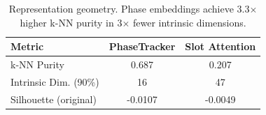 \begin{table}[t]
\centering
\caption{Representation geometry. Phase embeddings achieve 3.3$\times$ higher k-NN purity in 3$\times$ fewer intrinsic dimensions.}
\label{tab:geometry}
\begin{tabular}{lcc}
\toprule
Metric & PhaseTracker & Slot Attention \\
\midrule
k-NN Purity & 0.687 & 0.207 \\
Intrinsic Dim. (90\%) & 16 & 47 \\
Silhouette (original) & -0.0107 & -0.0049 \\
\bottomrule
\end{tabular}
\end{table}